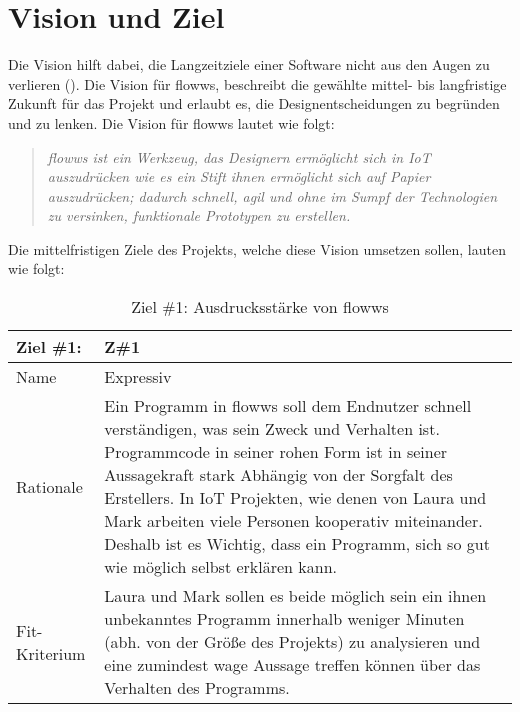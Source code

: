 \section{Vision und Ziel}
Die Vision hilft dabei, die Langzeitziele einer Software nicht aus den Augen zu verlieren (\cite{wiegers2013software}). Die Vision für flowws, beschreibt die gewählte mittel- bis langfristige Zukunft für das Projekt und erlaubt es, die Designentscheidungen zu begründen und zu lenken. Die Vision für flowws lautet wie folgt:
\begin{quote}
    \textit{flowws ist ein Werkzeug, das Designern ermöglicht sich in \ac{IoT} auszudrücken wie es ein Stift ihnen ermöglicht sich auf Papier auszudrücken; dadurch schnell, agil und ohne im Sumpf der Technologien zu versinken, funktionale Prototypen zu erstellen.}
\end{quote}

Die mittelfristigen Ziele des Projekts, welche diese Vision umsetzen sollen, lauten wie folgt: 

\begin{table}[H]
\caption{Ziel \#1: Ausdrucksstärke von flowws}
\label{tab:ziel3}
\begin{tabularx}{\textwidth}{lX}
\hline
\rowcolor[HTML]{EFEFEF} 
Ziel \#1:     & Z\#1 \\ \hline
Name          & Expressiv \\ \hline
Rationale     & Ein Programm in flowws soll dem Endnutzer schnell verständigen, was sein Zweck und Verhalten ist. Programmcode in seiner rohen Form ist in seiner Aussagekraft stark Abhängig von der Sorgfalt des Erstellers. In IoT Projekten, wie denen von Laura und Mark arbeiten viele Personen kooperativ miteinander. Deshalb ist es Wichtig, dass ein Programm, sich so gut wie möglich selbst erklären kann. \\ \hline
Fit-Kriterium & Laura und Mark sollen es beide möglich sein ein ihnen unbekanntes Programm innerhalb weniger Minuten (abh. von der Größe des Projekts) zu analysieren und eine zumindest wage Aussage treffen können über das Verhalten des Programms. \\ \hline
\end{tabularx}
\end{table}

